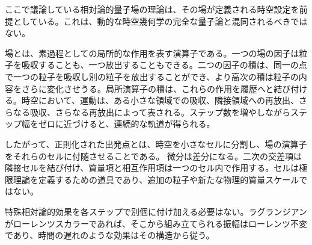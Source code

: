 ここで議論している相対論的量子場の理論は、その場が定義される時空設定を前提としている。これは、動的な時空幾何学の完全な量子論と混同されるべきではない。

\begin{classroomqa}
\end{classroomqa}

場とは、素過程としての局所的な作用を表す演算子である。一つの場の因子は粒子を吸収することも、一つ放出することもできる。二つの因子の積は、同一の点で一つの粒子を吸収し別の粒子を放出することができ、より高次の積は粒子の内容をさらに変化させうる。局所演算子の積は、これらの作用を履歴へと結び付ける。時空において、運動は、ある小さな領域での吸収、隣接領域への再放出、さらなる吸収、さらなる再放出によって表される。ステップ数を増やしながらステップ幅をゼロに近づけると、連続的な軌道が得られる。

\begin{classroomqa}
\end{classroomqa}

したがって、正則化された出発点とは、時空を小さなセルに分割し、場の演算子をそれらのセルに付随させることである。 微分は差分になる。二次の交差項は隣接セルを結び付け、質量項と相互作用項は一つのセル内で作用する。セルは極限理論を定義するための道具であり、追加の粒子や新たな物理的質量スケールではない。

特殊相対論的効果を各ステップで別個に付け加える必要はない。ラグランジアンがローレンツスカラーであれば、そこから組み立てられる振幅はローレンツ不変であり、時間の遅れのような効果はその構造から従う。

\begin{classroomqa}
\end{classroomqa}

